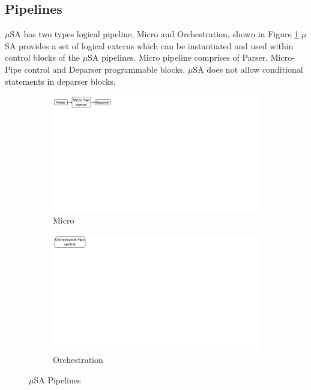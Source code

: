 \documentclass{hotnets19}
\begin{document}
\subsection{Pipelines}
\label{subsection:pipelines}
$\mu$SA has two types logical pipeline, Micro and Orchestration, shown in Figure \ref{fig:msa-pipelines}
$\mu$SA provides a set of logical externs which can be instantiated and used within control blocks of the $\mu$SA pipelines.
Micro pipeline comprises of Parser, Micro-Pipe control and Deparser programmable blocks.
$\mu$SA does not allow conditional statements in deparser blocks.
\begin{figure}
    \centering
    \begin{subfigure}{0.59\linewidth}
        \centering
        \includegraphics[trim=0 482 692 0, clip,scale=0.45]{msa-pipeline}
        \caption{Micro}
    \end{subfigure}\vline
    \begin{subfigure}{0.41\linewidth}
        \centering
        \includegraphics[trim=0 480 805 0,clip,scale=0.45]{micro-orchestration-pipeline}
        \caption{Orchestration}
    \end{subfigure}
\caption{$\mu$SA Pipelines}
\label{fig:msa-pipelines}
\end{figure}
\end{document}
